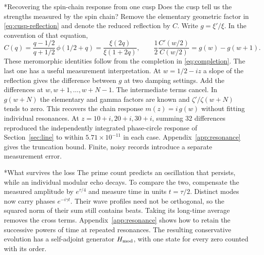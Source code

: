 \documentclass[11pt,letterpaper]{article}
\makeatletter
\renewcommand\subsection{\@startsection{subsection}{2}{\z@}{-2.0ex plus -.3ex}{.75ex}{\normalfont\normalsize\itshape}}
\numberwithin{equation}{section}
\makeatother
\begin{document}
\subsection*{Recovering the spin-chain response from one cusp}
Does the cusp tell us the strengths measured by the spin chain? Remove the elementary geometric factor in \eqref{eq:cusp-reflection} and denote the reduced reflection by $C$. Write $g=\xi'/\xi$. In the convention of that equation,
\begin{equation}
 C(q)=\frac{q-1/2}{q+1/2}\,\phi(1/2+q)
     =\frac{\xi(2q)}{\xi(1+2q)},\qquad
 \frac12\frac{C'(w/2)}{C(w/2)}=g(w)-g(w+1).
 \label{eq:cusp-shift}
\end{equation}
These meromorphic identities follow from the completion in \eqref{eq:completion}. The last one has a useful measurement interpretation. At $w=1/2-iz$ a slope of the reflection gives the difference between $g$ at two damping settings. Add the differences at $w,w+1,\ldots,w+N-1$. The intermediate terms cancel. In $g(w+N)$ the elementary and gamma factors are known and $\zeta'/\zeta(w+N)$ tends to zero. This recovers the chain response $m(z)=i\,g(w)$ without fitting individual resonances. At $z=10+i,20+i,30+i$, summing 32 differences reproduced the independently integrated phase-circle response of Section~\ref{sec:line} to within $5.71\times10^{-11}$ in each case. Appendix~\ref{app:resonance} gives the truncation bound. Finite, noisy records introduce a separate measurement error.

\subsection*{What survives the loss}
The prime count predicts an oscillation that persists, while an individual modular echo decays. To compare the two, compensate the measured amplitude by $e^{\tau/4}$ and measure time in units $t=\tau/2$. Distinct modes now carry phases $e^{-i\gamma t}$. Their wave profiles need not be orthogonal, so the squared norm of their sum still contains beats. Taking its long-time average removes the cross terms. Appendix~\ref{app:resonance} shows how to retain the successive powers of time at repeated resonances. The resulting conservative evolution has a self-adjoint generator $H_{\rm mod}$, with one state for every zero counted with its order.
\end{document}
